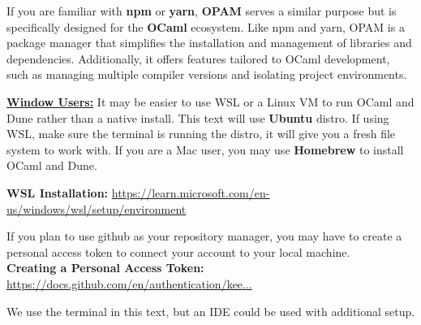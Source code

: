 \noindent
If you are familiar with \textbf{npm} or \textbf{yarn}, \textbf{OPAM} serves a similar purpose but is specifically designed for the \textbf{OCaml} ecosystem. Like npm and yarn, OPAM is a package manager that simplifies the installation and management of libraries and dependencies. Additionally, it offers features tailored to OCaml development, such as managing multiple compiler versions and isolating project environments.



\begin{Note}
	\underline{\textbf{Window Users:}} It may be easier to use WSL or a Linux VM to run OCaml and Dune rather than a native install.
	This text will use \textbf{Ubuntu} distro. If using WSL, make sure the terminal is running the distro, it will give you a fresh
	file system to work with. If you are a Mac user, you may use \textbf{Homebrew} to install OCaml and Dune.

	\noindent
	\textbf{WSL Installation:} \href{https://learn.microsoft.com/en-us/windows/wsl/setup/environment}{https://learn.microsoft.com/en-us/windows/wsl/setup/environment}
\end{Note}

\begin{Tip}
	If you plan to use github as your repository manager, you may have to create a personal access token to connect your account to your local machine.\\
	\textbf{Creating a Personal Access Token:} \href{https://docs.github.com/en/authentication/keeping-your-account-and-data-secure/managing-your-personal-access-tokens#creating-a-personal-access-token-classic}{https://docs.github.com/en/authentication/kee...}
\end{Tip}

\newpage

\noindent
We use the terminal in this text, but an IDE could be used with additional setup.

